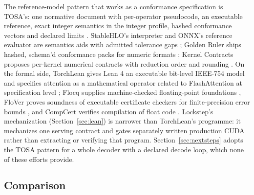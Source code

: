 \documentclass{article}
\begin{document}
The reference-model pattern that works as a conformance specification is TOSA's: one
normative document with per-operator pseudocode, an executable reference, exact integer
semantics in the integer profile, hashed conformance vectors and declared limits
\cite{tosa}.  StableHLO's interpreter and ONNX's reference evaluator are semantics aids
with admitted tolerance gaps \cite{stablehlo,onnxref2025}; Golden Ruler ships hashed,
schema'd conformance packs for numeric formats \cite{goldenruler2026}; Kernel Contracts
proposes per-kernel numerical contracts with reduction order and rounding
\cite{kernelcontracts2026}.  On the formal side, TorchLean gives Lean 4 an executable
bit-level IEEE-754 model and specifies attention as a mathematical operator related to
FlashAttention at specification level \cite{torchlean2026}; Flocq supplies machine-checked
floating-point foundations \cite{boldo2011flocq}, FloVer proves soundness of executable
certificate checkers for finite-precision error bounds \cite{becker2018flover}, and
CompCert verifies compilation of float code \cite{compcert}.  Lockstep's mechanization
(Section~\ref{sec:lean}) is narrower than TorchLean's programme: it mechanizes one serving
contract and gates separately written production CUDA rather than extracting or verifying
that program.  Section~\ref{sec:nextsteps}
adopts the TOSA pattern for a whole decoder with a declared decode loop, which none of these
efforts provide.

\subsection{Comparison}
\end{document}
